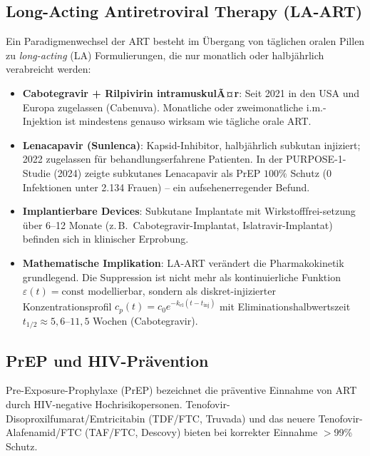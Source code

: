 ﻿\documentclass[a4paper,12pt]{article}
\theoremstyle{definition}
\begin{document}
\subsection{Long-Acting Antiretroviral Therapy (LA-ART)}

Ein Paradigmenwechsel der ART besteht im \"Ubergang von t\"aglichen oralen Pillen
zu \emph{long-acting} (LA) Formulierungen, die nur monatlich oder halbj\"ahrlich
verabreicht werden:

\begin{itemize}
\item \textbf{Cabotegravir + Rilpivirin intramuskulÃ¤r}: Seit 2021 in den USA
      und Europa zugelassen (Cabenuva). Monatliche oder zweimonatliche i.m.-Injektion
      ist mindestens genauso wirksam wie t\"agliche orale ART.

\item \textbf{Lenacapavir (Sunlenca)}: Kapsid-Inhibitor, halbj\"ahrlich subkutan
      injiziert; 2022 zugelassen f\"ur behandlungserfahrene Patienten.
      In der PURPOSE-1-Studie (2024) zeigte subkutanes Lenacapavir als PrEP
      $100\%$ Schutz (0 Infektionen unter 2.134 Frauen) -- ein aufsehenerregender
      Befund.

\item \textbf{Implantierbare Devices}: Subkutane Implantate mit Wirkstofffrei-setzung
      \"uber 6--12 Monate (z.\,B.\ Cabotegravir-Implantat, Islatravir-Implantat)
      befinden sich in klinischer Erprobung.

\item \textbf{Mathematische Implikation}: LA-ART ver\"andert die Pharmakokinetik
      grundlegend. Die Suppression ist nicht mehr als kontinuierliche Funktion
      $\varepsilon(t) = \text{const}$ modellierbar, sondern als diskret-injizierter
      Konzentrationsprofil $c_p(t) = c_0 e^{-k_{\text{el}}(t - t_{\text{inj}})}$
      mit Eliminationshalbwertszeit $t_{1/2} \approx 5{,}6$--$11{,}5$ Wochen (Cabotegravir).
\end{itemize}

\subsection{PrEP und HIV-Pr\"avention}

Pre-Exposure-Prophylaxe (PrEP) bezeichnet die pr\"aventive Einnahme von ART durch
HIV-negative Hochrisikopersonen. Tenofovir-Disoproxilfumarat/Emtricitabin (TDF/FTC,
Truvada) und das neuere Tenofovir-Alafenamid/FTC (TAF/FTC, Descovy) bieten bei
korrekter Einnahme $>$99\% Schutz.
\end{document}
